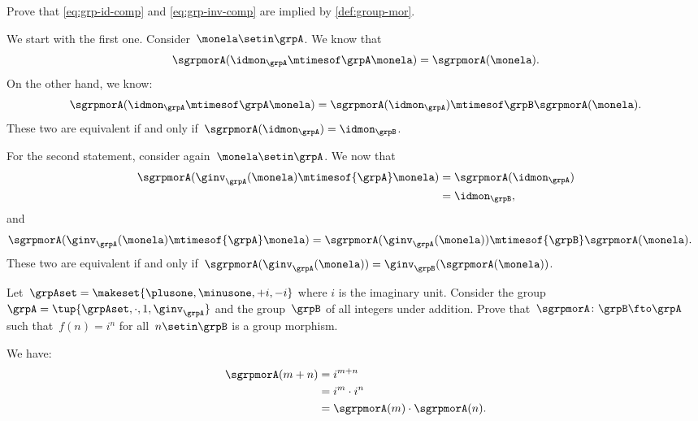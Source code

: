 \begin{exercise}
    Prove that \cref{eq:grp-id-comp} and \cref{eq:grp-inv-comp} are implied by \cref{def:group-mor}.
\end{exercise}
\begin{solution}
    We start with the first one.
    Consider~$\monela \setin \grpA$.
    We know that
    \begin{equation}
        \sgrpmorA(\idmon_\grpA \mtimesof\grpA \monela)=\sgrpmorA(\monela).
    \end{equation}
    On the other hand, we know:
    \begin{equation}
        \sgrpmorA(\idmon_\grpA \mtimesof\grpA \monela) = \sgrpmorA(\idmon_\grpA)\mtimesof\grpB \sgrpmorA(\monela).
    \end{equation}
    These two are equivalent if and only if~$\sgrpmorA(\idmon_\grpA)=\idmon_\grpB$.

    For the second statement, consider again~$\monela \setin \grpA$.
    We now that
    \begin{equation}
        \begin{aligned}
            \sgrpmorA(\ginv_{\grpA}(\monela)\mtimesof{\grpA} \monela) & =\sgrpmorA(\idmon_\grpA) \\
                                                                      & =\idmon_\grpB,
        \end{aligned}
    \end{equation}
    and
    \begin{equation}
        \begin{aligned}
            \sgrpmorA(\ginv_{\grpA}(\monela)\mtimesof{\grpA} \monela) & =\sgrpmorA(\ginv_{\grpA}(\monela))\mtimesof{\grpB} \sgrpmorA(\monela).
        \end{aligned}
    \end{equation}
    These two are equivalent if and only if~$\sgrpmorA(\ginv_{\grpA}(\monela))=\ginv_{\grpB}(\sgrpmorA(\monela))$.

\end{solution}

\begin{exercise}
    Let~$\grpAset=\makeset{\plusone,\minusone,+i,-i}$ where $i$ is the imaginary unit.
    Consider the group~$\grpA=\tup{\grpAset, \cdot, 1, \ginv_\grpA}$ and the group~$\grpB$ of all integers under addition.
    Prove that~$\sgrpmorA\colon \grpB \fto \grpA$ such that~$f(n)=i^n$ for all~$n\setin \grpB$ is a group morphism.
\end{exercise}
\begin{solution}
    We have:
    \begin{equation}
        \begin{aligned}
            \sgrpmorA(m+n) & =i^{m+n} \\
                           & =i^m \cdot i^n \\
                           & =\sgrpmorA(m)\cdot \sgrpmorA(n).
        \end{aligned}
    \end{equation}
\end{solution}

